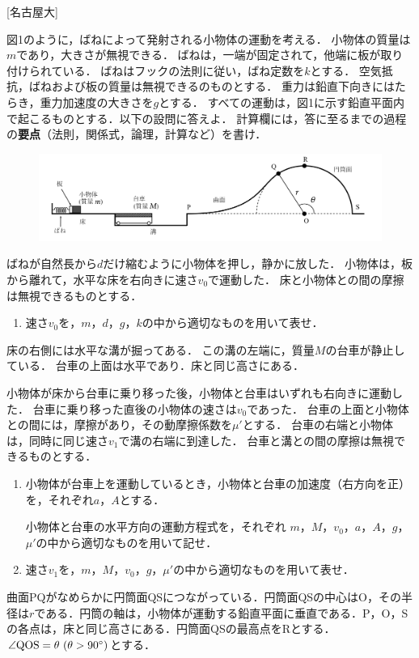 

\noindent{} [名古屋大]

図1のように，ばねによって発射される小物体の運動を考える．
小物体の質量は$m$であり，大きさが無視できる．
ばねは，一端が固定されて，他端に板が取り付けられている．
ばねはフックの法則に従い，ばね定数を$k$とする．
空気抵抗，ばねおよび板の質量は無視できるのものとする．
重力は鉛直下向きにはたらき，重力加速度の大きさを$g$とする．
すべての運動は，図1に示す鉛直平面内で起こるものとする．以下の設問に答えよ．
計算欄には，答に至るまでの過程の\textbf{要点}（法則，関係式，論理，計算など）を書け．


\begin{figure}[H]
  \centering
  \includegraphics[width=12cm]{fig/fig_1_4.pdf}
\end{figure}

ばねが自然長から$d$だけ縮むように小物体を押し，静かに放した．
小物体は，板から離れて，水平な床を右向きに速さ$v_0$で運動した．
床と小物体との間の摩擦は無視できるものとする．

\begin{enumerate}[label={\textbf{問\arabic*}}]
  \item \hzw 速さ$v_0$を，$m$，$d$，$g$，$k$の中から適切なものを用いて表せ．
\end{enumerate}
床の右側には水平な溝が掘ってある．
この溝の左端に，質量$M$の台車が静止している．
台車の上面は水平であり．床と同じ高さにある．

小物体が床から台車に乗り移った後，小物体と台車はいずれも右向きに運動した．
台車に乗り移った直後の小物体の速さは$v_0$であった．
台車の上面と小物体との間には，摩擦があり，その動摩擦係数を$\mu'$とする．
台車の右端と小物体は，同時に同じ速さ$v_1$で溝の右端に到達した．
台車と溝との間の摩擦は無視できるものとする．
\begin{enumerate}[resume, label={\textbf{問\arabic*}}]
  \item {\hzw}小物体が台車上を運動しているとき，小物体と台車の加速度（右方向を正）を，それぞれ$a$，$A$とする．
  
  {\hzw}小物体と台車の水平方向の運動方程式を，それぞれ
  $m$，$M$，$v_0$，$a$，$A$，$g$，$\mu'$の中から適切なものを用いて記せ．

  \item {\hzw}速さ$v_1$を，$m$，$M$，$v_0$，$g$，$\mu'$の中から適切なものを用いて表せ．
\end{enumerate}
曲面PQがなめらかに円筒面QSにつながっている．円筒面QSの中心はO，その半径は$r$である．円筒の軸は，小物体が運動する鉛直平面に垂直である．P，O，Sの各点は，床と同じ高さにある．円筒面QSの最高点をRとする．$\angle \mathrm{QOS} = \theta \ (\theta > 90{}^\circ)$とする．

